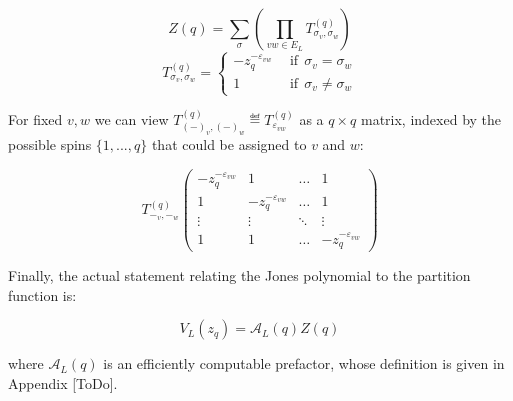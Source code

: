 \begin{equation}
	Z(q) = \sum_{\sigma} \left( \prod_{vw \in E_L} T_{\sigma_v, \sigma_w}^{(q)} \right)
\end{equation}
\begin{equation}
	T_{\sigma_v, \sigma_{w}}^{(q)}
	= \begin{cases}
		-z_q^{-\varepsilon_{vw}} &\ \ \text{if} \ \ \sigma_v = \sigma_{w} \\  
		1 &\ \ \text{if} \ \ \sigma_v \neq \sigma_{w}
	\end{cases}
\end{equation}

For fixed $v, w$ we can view $T_{(-)_v,(-)_w}^{(q)} \eqdef T_{\varepsilon_{vw}}^{(q)}$ as a $q \times q$ matrix, indexed by the possible spins $\{1, ..., q\}$ that could be assigned to $v$ and $w$: 

\begingroup
	\renewcommand*{\arraystretch}{1.5}
	\begin{equation}
	T_{-_v,-_w}^{(q)}
	\begin{pmatrix}
		-z_q^{-\varepsilon_{vw}} & 1 & \dots & 1 \\
		1 & -z_q^{-\varepsilon_{vw}} & \dots & 1 \\
		\vdots & \vdots & \ddots & \vdots\\
		1 & 1  & \dots & -z_q^{-\varepsilon_{vw}}
	\end{pmatrix}
\end{equation}
\endgroup

Finally, the actual statement relating the Jones polynomial to the partition function is:

\begin{equation}
	V_L(z_q) = \mathcal{A}_L(q)Z(q)
\end{equation}

where $\mathcal{A}_L(q)$ is an efficiently computable prefactor, whose definition is given in Appendix [ToDo]. 

